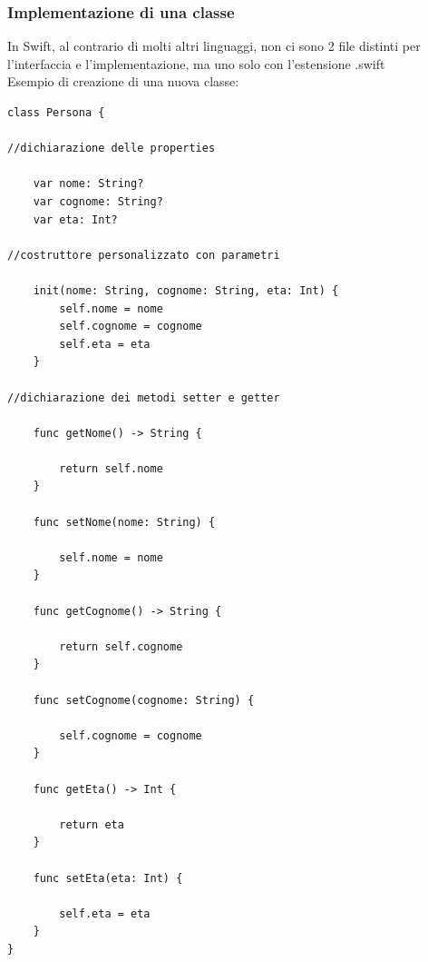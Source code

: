 \subsubsection{Implementazione di una classe}
In Swift, al contrario di molti altri linguaggi, non ci sono 2 file distinti per l'interfaccia e l'implementazione, ma uno solo con l'estensione .swift\\
Esempio di creazione di una nuova classe:\\
\lstset{language=[Objective]C, breakindent=40pt, breaklines}
\begin{lstlisting}
class Persona { 

//dichiarazione delle properties

	var nome: String? 
	var cognome: String? 
	var eta: Int?

//costruttore personalizzato con parametri 

	init(nome: String, cognome: String, eta: Int) {
		self.nome = nome
		self.cognome = cognome
		self.eta = eta
	}

//dichiarazione dei metodi setter e getter 

	func getNome() -> String {

		return self.nome
	}

	func setNome(nome: String) {

		self.nome = nome
	}

	func getCognome() -> String {

		return self.cognome
	}

	func setCognome(cognome: String) {
	
		self.cognome = cognome
	}

	func getEta() -> Int {
	
		return eta
	}

	func setEta(eta: Int) {

		self.eta = eta
	}
}
\end{lstlisting}
